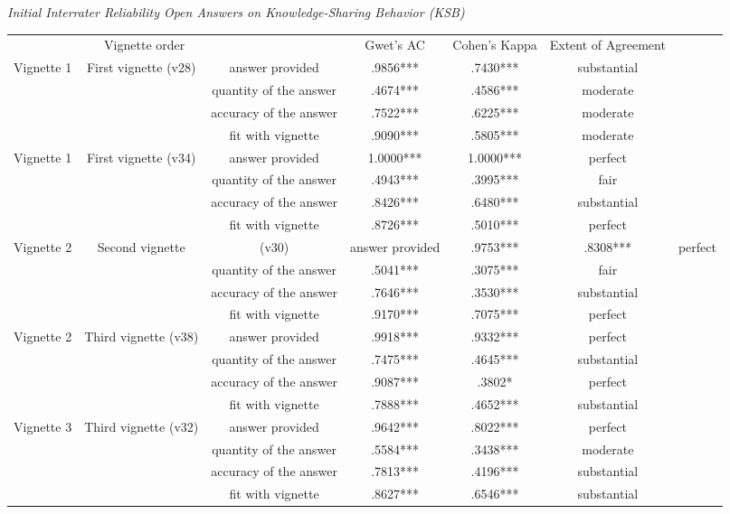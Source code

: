 \documentclass{article}
\begin{document}
\emph{Initial Interrater Reliability Open Answers on Knowledge-Sharing Behavior (KSB)}


\begin{table}

  
\begin{tabular}{c  c  c  c  c  c  c}

    &  Vignette order &   & Gwet's AC & Cohen's Kappa & Extent of Agreement\\
Vignette 1 & First vignette (v28) & answer provided & .9856*** & .7430*** & substantial\\
 &  & quantity of the answer & .4674*** & .4586*** & moderate\\
 &  & accuracy of the answer & .7522*** & .6225*** & moderate\\
 &  & fit with vignette & .9090*** & .5805*** & moderate\\
Vignette 1 & First vignette (v34) & answer provided & 1.0000*** & 1.0000*** & perfect\\
 &  & quantity of the answer & .4943*** & .3995*** & fair\\
 &  & accuracy of the answer & .8426*** & .6480*** & substantial\\
 &  & fit with vignette & .8726*** & .5010*** & perfect\\
Vignette 2 & Second vignette & (v30) & answer provided & .9753*** & .8308*** & perfect\\
 &  & quantity of the answer & .5041*** & .3075*** & fair\\
 &  & accuracy of the answer & .7646*** & .3530*** & substantial\\
 &  & fit with vignette & .9170*** & .7075*** & perfect\\
Vignette 2 & Third vignette (v38) & answer provided & .9918*** & .9332*** & perfect\\
 &  & quantity of the answer & .7475*** & .4645*** & substantial\\
 &  & accuracy of the answer & .9087*** & .3802* & perfect\\
 &  & fit with vignette & .7888*** &  .4652*** & substantial\\
Vignette 3 & Third vignette (v32) & answer provided & .9642*** & .8022*** & perfect\\
 &  & quantity of the answer & .5584*** & .3438*** & moderate\\
 &  & accuracy of the answer & .7813*** & .4196*** & substantial\\
 &  & fit with vignette & .8627*** & .6546*** & substantial\\

\end{tabular}
\end{table}
\end{document}
